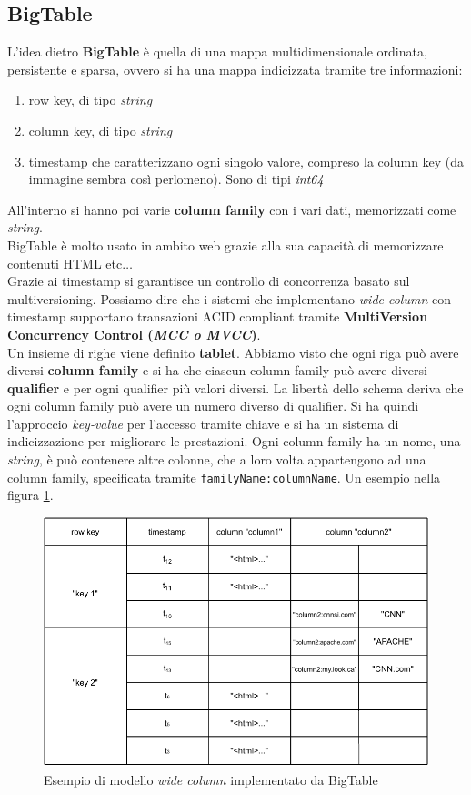 \documentclass[a4paper,12pt, oneside]{book}
\begin{document}
\subsection{BigTable}
L'idea dietro \textbf{BigTable} è quella di una mappa multidimensionale
ordinata, persistente e sparsa, ovvero si ha una mappa indicizzata tramite tre
informazioni:
\begin{enumerate}
  \item row key, di tipo \textit{string}
  \item column key, di tipo \textit{string}
  \item timestamp che caratterizzano ogni singolo valore, compreso la column key
  (da immagine sembra così perlomeno). Sono di tipi \textit{int64}
\end{enumerate}
All'interno si hanno poi varie \textbf{column family} con i vari dati,
memorizzati come \textit{string}.\\
BigTable è molto usato in ambito web grazie alla sua capacità di memorizzare
contenuti HTML etc$\ldots$\\
Grazie ai timestamp si garantisce un controllo di concorrenza basato sul
multiversioning. Possiamo dire che i sistemi che implementano \textit{wide
  column} con timestamp supportano transazioni ACID compliant tramite
\textbf{MultiVersion Concurrency Control (\textit{MCC o MVCC})}.\\
Un insieme di righe viene definito \textbf{tablet}. Abbiamo visto che ogni riga
può avere diversi \textbf{column family} e si ha che ciascun column
family può avere diversi \textbf{qualifier} e per ogni qualifier più valori
diversi. La libertà dello schema deriva che ogni column family può avere un
numero diverso di qualifier. Si ha quindi l'approccio \textit{key-value} per
l'accesso tramite chiave e si ha un sistema di indicizzazione per migliorare le
prestazioni. Ogni column family ha un nome, una \textit{string}, è può contenere
altre colonne, che a loro volta appartengono ad una column family, specificata
tramite \texttt{familyName:columnName}.  Un esempio nella figura \ref{fig:col}.
\begin{figure}
  \centering
  \includegraphics[scale = 0.8]{img/col.pdf}
  \caption{Esempio di modello \textit{wide column} implementato da BigTable}
  \label{fig:col}
\end{figure}
\end{document}

